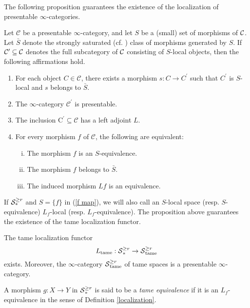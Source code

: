 The following proposition guarantees the existence of the localization of presentable $\infty$-categories.
\begin{proposition}
    \cite[Proposition 5.5.4.15.]{HTT}
    \label{Prop 5.5.4.15. HTT}
    Let $\mathcal{C}$ be a presentable $\infty$-category, and let $S$ be a (small) set of morphisms of ${\mathcal{C}}$. Let $\bar{S}$ denote the strongly saturated (cf. \cite[Definition 5.5.4.5.]{HTT}) class of morphisms generated by $S$. If $\mathcal{C}^{\prime} \subseteq {\mathcal{C}}$ denotes the full subcategory of ${\mathcal{C}}$ consisting of $S$-local objects, then the following affirmations hold.
    \begin{enumerate}
        \item For each object $C \in \mathcal{C}$, there exists a morphism $s: C \rightarrow C^{\prime}$ such that $C^{\prime}$ is $S$-local and $s$ belongs to $\bar{S}$.
        \item The $\infty$-category $\mathcal{C}^{\prime}$ is presentable.
        \item The inclusion $\mathrm{C}^{\prime} \subseteq \mathcal{C}$ has a left adjoint $L$.
        \item For every morphism $f$ of $\mathcal{C}$, the following are equivalent:
        \begin{enumerate}[(i)]
            \item  The morphism $f$ is an $S$-equivalence.
            \item The morphism $f$ belongs to $\bar{S}$.
            \item The induced morphism $L f$ is an equivalence.
        \end{enumerate}
    \end{enumerate}
\end{proposition}
If ${\mathcal{S}}^{\geq r}_{*}$ and $S= \{f\}$ in (\ref{f map}), we will also call an $S$-local space (resp. $S$-equivalence) $L_f$-local (resp. $L_f$-equivalence).
The proposition above guarantees the existence of the tame localization functor. 
\begin{corollary}
\label{existence of tame localization}
The tame localization functor
$$
L_{\operatorname{\operatorname{tame}}}: \operatorname{\mathcal{S}}^{\geq r}_* \to \operatorname{\mathcal{S}}^{\geq r}_{\operatorname{\operatorname{tame}}}
$$
exists. Moreover, the $\infty$-category $\operatorname{\mathcal{S}}^{\geq r}_{\operatorname{\operatorname{tame}}}$ of tame spaces is a presentable $\infty$-category.
\end{corollary}
\begin{definition}
    A morphism $g:X \to Y$ in $\operatorname{\mathcal{S}}^{\geq r}_*$ is said to be a \emph{tame equivalence} if it is an $L_f$-equivalence in the sense of Definition \ref{localization}.
\end{definition}

